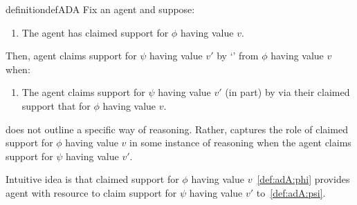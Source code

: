 

\begin{note}
  \begin{restatable}[\adA{}]{definition}{defADA}\label{AR:adA}
    Fix an agent and suppose:
    \begin{enumerate}[label=\textsf{S:\arabic*}., ref=(\textsf{S}:\arabic*), series=adA_counter]
    \item\label{def:adA:phi} The agent has claimed support for \(\phi\) having value \(v\).
    \end{enumerate}
    Then, agent claims support for \(\psi\) having value \(v'\) by `\adA{}' from \(\phi\) having value \(v\) when:
    \begin{enumerate}[label=\textsf{S:\arabic*}., ref=(\textsf{S}:\arabic*), resume*=adA_counter]
    \item\label{def:adA:psi} The agent claims support for \(\psi\) having value \(v'\) (in part) by via their claimed support that for \(\phi\) having value \(v\).
    \end{enumerate}
    \vspace{-\baselineskip}
  \end{restatable}
\end{note}

\begin{note}
  \adA{} does not outline a specific way of reasoning.
  Rather, captures the role of claimed support for \(\phi\) having value \(v\) in some instance of reasoning when the agent claims support for \(\psi\) having value \(v'\).

  Intuitive idea is that claimed support for \(\phi\) having value \(v\)~\ref{def:adA:phi} provides agent with resource to claim support for \(\psi\) having value \(v'\) to~\ref{def:adA:psi}.
\end{note}

